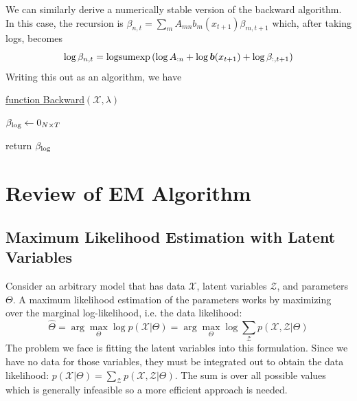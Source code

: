 \documentclass[onecolumn]{gwclass}
\begin{document}
	We can similarly derive a numerically stable version of the backward algorithm. In this case, the recursion is 	$ \beta_{n,t} = \sum_m A_{mn} b_m(x_{t+1})\beta_{m,t+1} $ which, after taking logs, becomes
	$$ \log\beta_{n,t} = \text{\normalfont{logsumexp}}\left( \log A_{:n} + \log\boldsymbol{b}(x_{t+1}) + \log \beta_{:,t+1} \right) $$
	Writing this out as an algorithm, we have
	
	\begin{algorithm}
		\caption{Backward Algorithm --- Numerically Stable}
		
		\underline{function Backward}$(\mathcal{X},\lambda)$\\
		
		$\beta_{\text{\normalfont{log}}} \leftarrow 0_{N\times T}$
		
		
		return $\beta_{\text{\normalfont{log}}}$
	\end{algorithm}


	\section{Review of EM Algorithm}
	\subsection{Maximum Likelihood Estimation with Latent Variables}
	Consider an arbitrary model that has data $\mathcal{X}$, latent variables $\mathcal{Z}$, and parameters $\Theta$. A maximum likelihood estimation of the parameters works by maximizing over the marginal log-likelihood, i.e. the data likelihood: $$\hat\Theta=\arg\max_\Theta \log p(\mathcal{X}|\Theta) = \arg\max_\Theta \log\sum_\mathcal{Z} p(\mathcal{X},\mathcal{Z}|\Theta)$$ The problem we face is fitting the latent variables into this formulation. Since we have no data for those variables, they must be integrated out to obtain the data likelihood: $  p(\mathcal{X}|\Theta)  =\sum_{\mathcal{Z}} p(\mathcal{X},\mathcal{Z}|\Theta) $. The sum is over all possible values which is generally infeasible so a more efficient approach is needed. 
	
\end{document}
